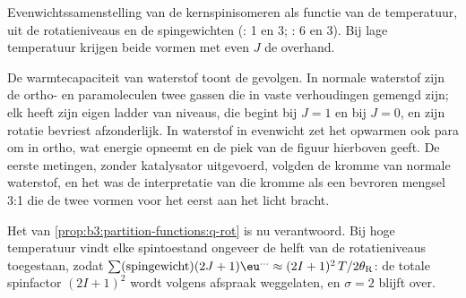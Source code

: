 \begin{omfigure}

{\small Evenwichtssamenstelling van de kernspinisomeren als functie van de
temperatuur, uit de rotatieniveaus en de spingewichten (: 1 en 3;
: 6 en 3). Bij lage temperatuur krijgen beide vormen met even $J$
de overhand.}
\end{omfigure}

De warmtecapaciteit van waterstof toont de gevolgen. In normale waterstof
zijn de ortho- en paramoleculen twee gassen die in vaste verhoudingen
gemengd zijn; elk heeft zijn eigen ladder van niveaus, die begint bij
$J = 1$ en bij $J = 0$, en zijn rotatie bevriest afzonderlijk. In waterstof
in evenwicht zet het opwarmen ook para om in ortho, wat energie opneemt en
de piek van de figuur hierboven geeft. De eerste metingen, zonder
katalysator uitgevoerd, volgden de kromme van normale waterstof, en het
was de interpretatie van die kromme als een bevroren mengsel 3:1 die de
twee vormen voor het eerst aan het licht bracht.

\begin{remark}
Het  van \cref{prop:b3:partition-functions:q-rot} is nu
verantwoord. Bij hoge temperatuur vindt elke spintoestand ongeveer de
helft van de rotatieniveaus toegestaan, zodat $\sum(\text{spingewicht})(2J+1)\eu^{\dots} \approx (2I+1)^2\,T/2\theta_{\mathrm R}$: de
totale spinfactor $(2I+1)^2$ wordt volgens afspraak weggelaten, en $\sigma = 2$ blijft over.
\end{remark}

